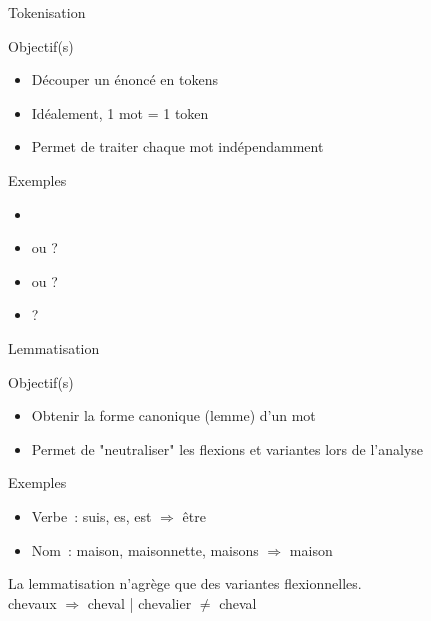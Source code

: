 \documentclass[serif, aspectratio=169]{beamer}
\begin{document}
\begin{frame}{Tokenisation}
    \pause
    \begin{block}{Objectif(s)}
        \begin{itemize}
            \item Découper un énoncé en tokens
            \item Idéalement, 1 mot = 1 token
            \item Permet de traiter chaque mot indépendamment
        \end{itemize}
    \end{block}
    \pause
    \begin{block}{Exemples}
        \begin{itemize}
            \pause
            \item {}    
            \pause
            \item {} ou    ?
            \pause
            \item {} ou  \wordbox{-}  ?
            \pause
            \item {}      ?
        \end{itemize}
    \end{block}
\end{frame}

\begin{frame}{Lemmatisation}
    \pause
    \begin{block}{Objectif(s)}
        \begin{itemize}
            \item Obtenir la forme canonique (lemme) d'un mot
            \item Permet de "neutraliser" les flexions et variantes lors de l'analyse
        \end{itemize}
    \end{block}
    \pause
    \begin{block}{Exemples}
        \begin{itemize}
            \item Verbe~: suis, es, est $\Rightarrow$ être
            \item Nom~: maison, maisonnette, maisons $\Rightarrow$ maison
        \end{itemize}
    \end{block}
    \vfill
    \pause
    \begin{center}
        {\Large
        La lemmatisation n'agrège que des variantes flexionnelles.} \\
        \pause
        chevaux $\Rightarrow$ cheval | chevalier $\ne$ cheval
    \end{center}
\end{frame}
\end{document}
